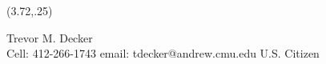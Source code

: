 \documentclass[]{article}
\begin{document}
%
%
%
\begin{textblock}{9}(3.72,.25)
\begin{center}
{\fontsize{40}{40}\selectfont Trevor M. Decker}\\[.25em]
{\fontsize{9}{9}\selectfont
Cell: 412-266-1743  \hspace*{.5cm} email: tdecker@andrew.cmu.edu  \hspace*{.5cm} U.S. Citizen\\
}
\end{center}
\end{textblock}

\end{document}
